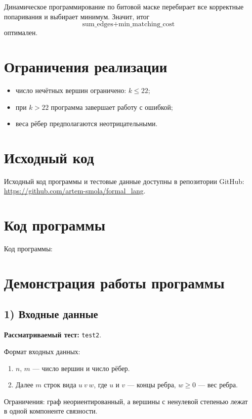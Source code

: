 \documentclass[12pt,a4paper]{article}
\begin{document}
Динамическое программирование по битовой маске перебирает все корректные попаривания и выбирает минимум.
Значит, итог
\[
\text{sum\_edges} + \text{min\_matching\_cost}
\]
оптимален.

\section{Ограничения реализации}
\begin{itemize}
    \item число нечётных вершин ограничено: $k \le 22$;
    \item при $k > 22$ программа завершает работу с ошибкой;
    \item веса рёбер предполагаются неотрицательными.
\end{itemize}

\section{Исходный код}
Исходный код программы и тестовые данные доступны в репозитории GitHub:
\url{https://github.com/artem-smola/formal_lang}.

\section{Код программы}

Код программы:

{\small
{}
}

\section{Демонстрация работы программы}
\subsection*{1) Входные данные}
\textbf{Рассматриваемый тест:} \texttt{test2}.

Формат входных данных:
\begin{enumerate}
    \item $n,\,m$ --- число вершин и число рёбер.
    \item Далее $m$ строк вида $u\ v\ w$, где $u$ и $v$ --- концы ребра, $w \ge 0$ --- вес ребра.
\end{enumerate}
Ограничения: граф неориентированный, а вершины с ненулевой степенью лежат в одной компоненте связности.
\end{document}
